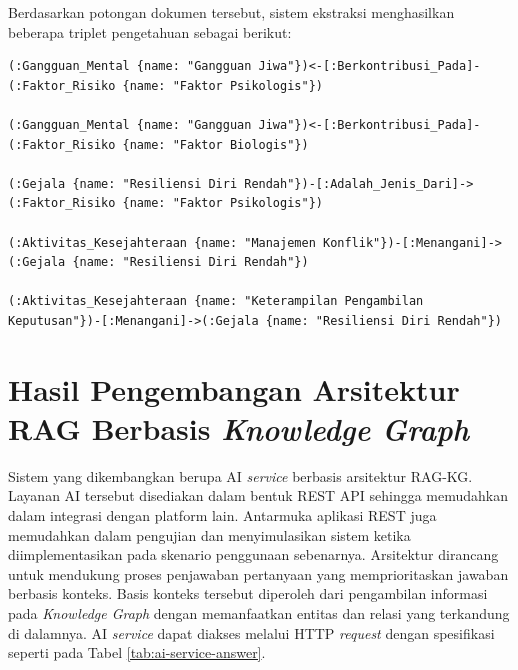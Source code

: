 Berdasarkan potongan dokumen tersebut, sistem ekstraksi menghasilkan beberapa triplet pengetahuan sebagai berikut:

\begin{lstlisting}[frame=single, numbers=none, basicstyle=\ttfamily\footnotesize]
(:Gangguan_Mental {name: "Gangguan Jiwa"})<-[:Berkontribusi_Pada]-(:Faktor_Risiko {name: "Faktor Psikologis"})

(:Gangguan_Mental {name: "Gangguan Jiwa"})<-[:Berkontribusi_Pada]-(:Faktor_Risiko {name: "Faktor Biologis"})

(:Gejala {name: "Resiliensi Diri Rendah"})-[:Adalah_Jenis_Dari]->(:Faktor_Risiko {name: "Faktor Psikologis"})

(:Aktivitas_Kesejahteraan {name: "Manajemen Konflik"})-[:Menangani]->(:Gejala {name: "Resiliensi Diri Rendah"})

(:Aktivitas_Kesejahteraan {name: "Keterampilan Pengambilan Keputusan"})-[:Menangani]->(:Gejala {name: "Resiliensi Diri Rendah"})
\end{lstlisting}

\section{Hasil Pengembangan Arsitektur RAG Berbasis \textit{Knowledge Graph}}

Sistem yang dikembangkan berupa AI \textit{service} berbasis arsitektur RAG-KG.
Layanan AI tersebut disediakan dalam bentuk REST API sehingga memudahkan dalam integrasi dengan platform lain.
Antarmuka aplikasi REST juga memudahkan dalam pengujian dan menyimulasikan sistem ketika diimplementasikan pada skenario penggunaan sebenarnya.
Arsitektur dirancang untuk mendukung proses penjawaban pertanyaan yang memprioritaskan jawaban berbasis konteks.
Basis konteks tersebut diperoleh dari pengambilan informasi pada \textit{Knowledge Graph} dengan memanfaatkan entitas dan relasi yang terkandung di dalamnya.
AI \textit{service} dapat diakses melalui HTTP \textit{request} dengan spesifikasi seperti pada Tabel \ref{tab:ai-service-answer}.

